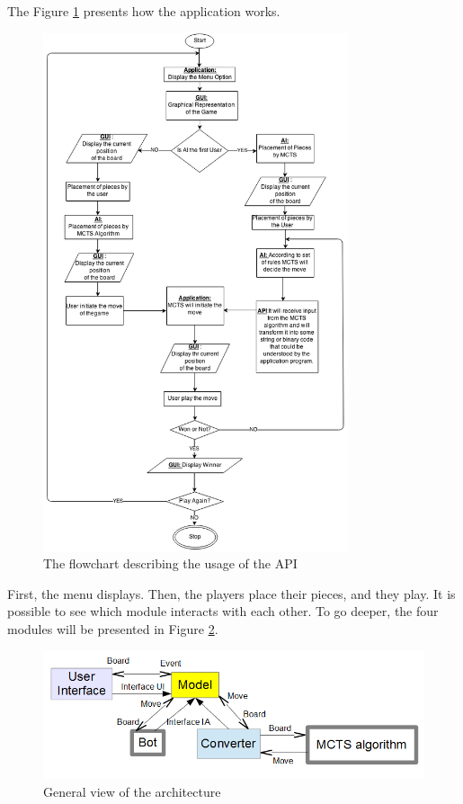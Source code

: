 The Figure \ref{fig:dia} presents how the application works.
\newpage
\begin{figure}[H]
	\centering
	\includegraphics[width=0.80\textwidth]{2General_Architecture/2.1.2GeneralView/api.png}
	\caption{The flowchart describing the usage of the API}
	\label{fig:dia}
\end{figure}
\thispagestyle{empty}

First, the menu displays. Then, the players place their pieces, and they play. It is possible to see which module interacts with each other. To go deeper, the four modules will be presented in Figure \ref{fig:gra}.

\begin{figure}[!h]
\centering
\includegraphics[width=1\textwidth]{2General_Architecture/2.1.2GeneralView/prep.png}
\caption{General view of the architecture}
\label{fig:gra}
\end{figure}

